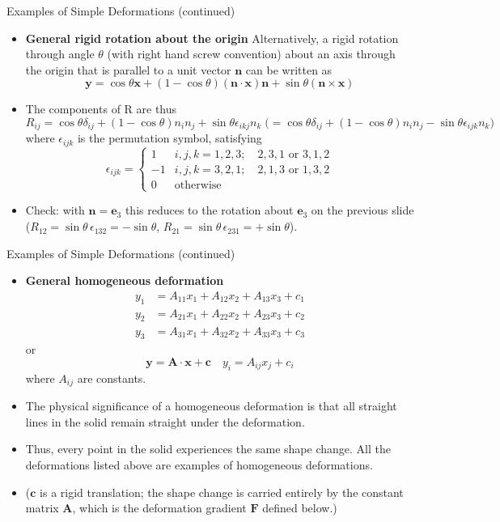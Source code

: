 \documentclass[aspectratio=169,11pt]{beamer}
\begin{document}
\begin{frame}{Examples of Simple Deformations (continued)}
  \begin{itemize}
    \item   \textbf{General rigid rotation about the origin}
    Alternatively, a rigid rotation through angle \(\theta\) (with right hand screw convention) about an axis through the origin that is parallel to a unit vector \(\mathbf{n}\) can be written as
    $$ \mathbf{y} = \cos\theta \mathbf{x} + (1 - \cos\theta)(\mathbf{n} \cdot \mathbf{x})\mathbf{n} + \sin\theta (\mathbf{n} \times \mathbf{x}) $$
    \item   The components of R are thus
    $$ R_{ij} = \cos\theta \delta_{ij} + (1 - \cos\theta)n_i n_j + \sin\theta \epsilon_{ikj} n_k \;\big(= \cos\theta \delta_{ij} + (1 - \cos\theta)n_i n_j - \sin\theta \epsilon_{ijk} n_k\big)$$
    where \(\epsilon_{ijk}\) is the permutation symbol, satisfying
    $$
    \epsilon_{ijk}=\begin{cases}
      1 & i,j,k = 1,2,3; \quad 2,3,1 \text{ or } 3,1,2 \\
      -1 & i,j,k = 3,2,1; \quad 2,1,3 \text{ or } 1,3,2 \\
      0 & \text{otherwise}
    \end{cases}
    $$
    \item   Check: with $\mathbf{n}=\mathbf{e}_3$ this reduces to the rotation about $\mathbf{e}_3$ on the previous slide ($R_{12} = \sin\theta\,\epsilon_{132} = -\sin\theta$, $R_{21} = \sin\theta\,\epsilon_{231} = +\sin\theta$).
  \end{itemize}
\end{frame}

\begin{frame}{Examples of Simple Deformations (continued)}
  \begin{itemize}
    \item   \textbf{General homogeneous deformation}
    $$
    \begin{aligned}
      y_1 &= A_{11} x_1 + A_{12} x_2 + A_{13} x_3 + c_1 \\
      y_2 &= A_{21} x_1 + A_{22} x_2 + A_{23} x_3 + c_2 \\
      y_3 &= A_{31} x_1 + A_{32} x_2 + A_{33} x_3 + c_3
    \end{aligned}
    $$
    or
    $$ \mathbf{y} = \mathbf{A} \cdot \mathbf{x} + \mathbf{c} \quad y_i = A_{ij} x_j + c_i $$
    where \(A_{ij}\) are constants.
    \item   The physical significance of a homogeneous deformation is that all straight lines in the solid remain straight under the deformation.
    \item   Thus, every point in the solid experiences the same shape change. All the deformations listed above are examples of homogeneous deformations.
    \item   ($\mathbf{c}$ is a rigid translation; the shape change is carried entirely by the constant matrix $\mathbf{A}$, which is the deformation gradient $\mathbf{F}$ defined below.)
  \end{itemize}
\end{frame}
\end{document}
